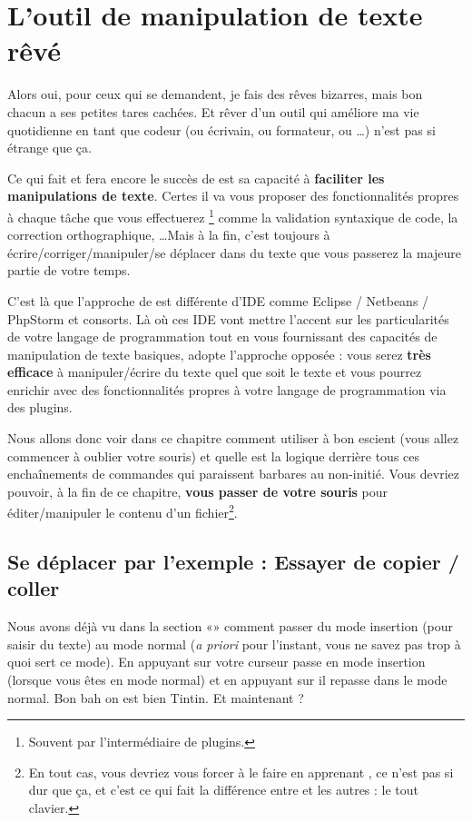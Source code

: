 \chapter{L'outil de manipulation de texte rêvé}

Alors oui, pour ceux qui se demandent, je fais des rêves bizarres, mais bon chacun a ses petites tares cachées. Et rêver d'un outil qui améliore ma vie quotidienne en tant que codeur (ou écrivain, ou formateur, ou \ldots) n'est pas si étrange que ça.

Ce qui fait et fera encore le succès de \vim est sa capacité à \textbf{faciliter les manipulations de texte}. Certes il va vous proposer des fonctionnalités propres à chaque tâche que vous effectuerez \footnote{Souvent par l'intermédiaire de plugins.} comme la validation syntaxique de code, la correction orthographique, \ldots Mais à la fin, c'est toujours à écrire/corriger/manipuler/se déplacer dans du texte que vous passerez la majeure partie de votre temps. 

C'est là que l'approche de \vim est différente d'IDE comme Eclipse / Netbeans / PhpStorm et consorts. Là où ces IDE vont mettre l'accent sur les particularités de votre langage de programmation tout en vous fournissant des capacités de manipulation de texte basiques, \vim adopte l'approche opposée : vous serez \textbf{très efficace} à manipuler/écrire du texte quel que soit le texte et vous pourrez enrichir \vim avec des fonctionnalités propres à votre langage de programmation via des plugins.

Nous allons donc voir dans ce chapitre comment utiliser \vim à bon escient (vous allez commencer à oublier votre souris) et quelle est la logique derrière tous ces enchaînements de commandes qui paraissent barbares au non-initié. Vous devriez pouvoir, à la fin de ce chapitre, \textbf{vous passer de votre souris} pour éditer/manipuler le contenu d'un fichier\footnote{En tout cas, vous devriez vous forcer à le faire en apprenant \vim, ce n'est pas si dur que ça, et c'est ce qui fait la différence entre \vim et les autres : le tout clavier.}.

\section{Se déplacer par l'exemple : Essayer de copier / coller}\label{sec:se-deplacer}


Nous avons déjà vu dans la section «» comment passer du mode insertion (pour saisir du texte) au mode normal (\emph{a priori} pour l'instant, vous ne savez pas trop à quoi sert ce mode). En appuyant sur \tti votre curseur passe en mode insertion (lorsque vous êtes en mode normal) et en appuyant sur \ttesc il repasse dans le mode normal. Bon bah on est bien Tintin. Et maintenant ? 

